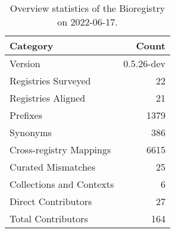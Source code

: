 \begin{table}
\centering
\caption{Overview statistics of the Bioregistry on 2022-06-17.}
\label{tab:bioregistry-summary}
\begin{tabular}{lr}
\toprule
                Category &      Count \\
\midrule
                 Version & 0.5.26-dev \\
     Registries Surveyed &         22 \\
      Registries Aligned &         21 \\
                Prefixes &       1379 \\
                Synonyms &        386 \\
 Cross-registry Mappings &       6615 \\
      Curated Mismatches &         25 \\
Collections and Contexts &          6 \\
     Direct Contributors &         27 \\
      Total Contributors &        164 \\
\bottomrule
\end{tabular}
\end{table}

